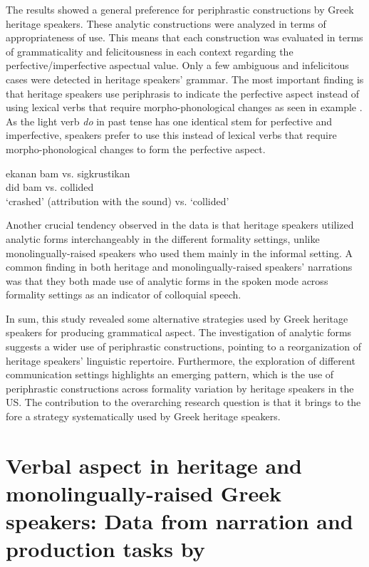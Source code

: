\documentclass[output=paper,colorlinks,citecolor=brown]{langscibook}
\begin{document}
The results showed a general preference for periphrastic constructions by Greek heritage speakers. These analytic constructions were analyzed in terms of appropriateness of use. This means that each construction was evaluated in terms of grammaticality and felicitousness in each context regarding the perfective/imperfective aspectual value. Only a few ambiguous and infelicitous cases were detected in heritage speakers' grammar. The most important finding is that heritage speakers use periphrasis to indicate the perfective aspect instead of using lexical verbs that require morpho-phonological changes as seen in example . As the light verb \textit{do} in past tense has one identical stem for perfective and imperfective, speakers prefer to use this instead of lexical verbs that require morpho-phonological changes to form the perfective aspect. 

\ea \label{2nd_periphrases_rizou}
\gll ekanan bam vs. sigkrustikan \\ 
	did bam vs. collided \\
\glt `crashed' (attribution with the sound) vs. `collided' 
\z 
{}

Another crucial tendency observed in the data is that heritage speakers utilized analytic forms interchangeably in the different formality settings, unlike monolingually-raised speakers who used them mainly in the informal setting. A common finding in both heritage and monolingually-raised speakers' narrations was that they both made use of analytic forms in the spoken mode across formality settings as an indicator of colloquial speech.

In sum, this study revealed some alternative strategies used by Greek heritage speakers for producing grammatical aspect. The investigation of analytic forms suggests a wider use of periphrastic constructions, pointing to a reorganization of heritage speakers' linguistic repertoire. Furthermore, the exploration of different communication settings highlights an emerging pattern, which is the use of periphrastic constructions across formality variation by heritage speakers in the US. The contribution to the overarching research question is that it brings to the fore a strategy systematically used by Greek heritage speakers. 

\section{Verbal aspect in heritage and monolingually-raised Greek speakers: Data from narration and production tasks by \textcite{rizou2021verbal}} \label{study_with_elicited_production_task}
\end{document}
